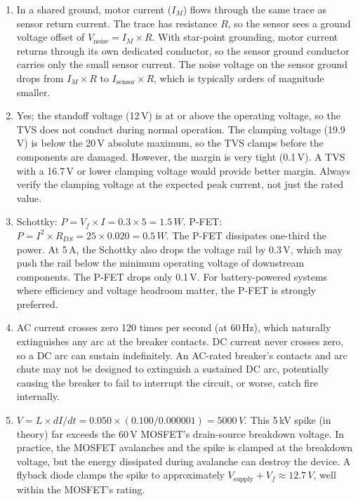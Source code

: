 \documentclass[11pt,letterpaper,twoside,openany]{book}
\begin{document}
\begin{enumerate}[leftmargin=1.5em]
  \item In a shared ground, motor current ($I_M$) flows through the same trace as sensor return current. The trace has resistance $R$, so the sensor sees a ground voltage offset of $V_{\text{noise}} = I_M \times R$. With star-point grounding, motor current returns through its own dedicated conductor, so the sensor ground conductor carries only the small sensor current. The noise voltage on the sensor ground drops from $I_M \times R$ to $I_{\text{sensor}} \times R$, which is typically orders of magnitude smaller.

  \item Yes; the standoff voltage (12\,V) is at or above the operating voltage, so the TVS does not conduct during normal operation. The clamping voltage (19.9\,V) is below the 20\,V absolute maximum, so the TVS clamps before the components are damaged. However, the margin is very tight (0.1\,V). A TVS with a 16.7\,V or lower clamping voltage would provide better margin. Always verify the clamping voltage at the expected peak current, not just the rated value.

  \item Schottky: $P = V_f \times I = 0.3 \times 5 = 1.5\,W$. P-FET: $P = I^2 \times R_{DS} = 25 \times 0.020 = 0.5\,W$. The P-FET dissipates one-third the power. At 5\,A, the Schottky also drops the voltage rail by 0.3\,V, which may push the rail below the minimum operating voltage of downstream components. The P-FET drops only 0.1\,V. For battery-powered systems where efficiency and voltage headroom matter, the P-FET is strongly preferred.

  \item AC current crosses zero 120 times per second (at 60\,Hz), which naturally extinguishes any arc at the breaker contacts. DC current never crosses zero, so a DC arc can sustain indefinitely. An AC-rated breaker's contacts and arc chute may not be designed to extinguish a sustained DC arc, potentially causing the breaker to fail to interrupt the circuit, or worse, catch fire internally.

  \item $V = L \times dI/dt = 0.050 \times (0.100 / 0.000001) = 5000\,V$. This 5\,kV spike (in theory) far exceeds the 60\,V MOSFET's drain-source breakdown voltage. In practice, the MOSFET avalanches and the spike is clamped at the breakdown voltage, but the energy dissipated during avalanche can destroy the device. A flyback diode clamps the spike to approximately $V_{\text{supply}} + V_f \approx 12.7\,V$, well within the MOSFET's rating.


\end{enumerate}
\end{document}
